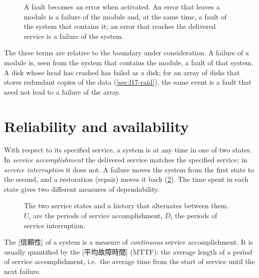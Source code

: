 \documentclass[../main.tex]{subfiles}
\begin{document}
\begin{figure}[htbp]
  \centering
  
  \caption{A fault becomes an error when activated.  An error that leaves a
    module is a failure of the module and, at the same time, a fault of the
    system that contains it; an error that reaches the delivered service is a
    failure of the system.}
  \label{fig:l17-fault-chain}
\end{figure}

The three terms are relative to the boundary under consideration.  A failure
of a module is, seen from the system that contains the module, a fault of
that system.  A disk whose head has crashed has failed as a disk; for an
array of disks that stores redundant copies of the data (\cref{sec:l17-raid}),
the same event is a fault that need not lead to a failure of the array.

\section{Reliability and availability}
\label{sec:l17-reliability}

With respect to its specified service, a system is at any time in one of
two states.  In \emph{service
accomplishment} the delivered service matches the specified service; in
\emph{service interruption} it does not.  A failure moves the system from
the first state to the second, and a restoration (repair) moves it back
(\cref{fig:l17-service-timeline}).  The time spent in each state gives two
different measures of dependability.

\begin{figure}[htbp]
  \centering
  
  \caption{The two service states and a history that alternates between
    them.  $U_i$ are the periods of service accomplishment, $D_i$ the periods
    of service interruption.}
  \label{fig:l17-service-timeline}
\end{figure}

\begin{definition}[Reliability]
  The [信頼性] of a system is a measure of
  \emph{continuous} service accomplishment.  It is usually quantified by the
  [平均故障時間]
  (MTTF): the average length of a period of service accomplishment, i.e.\
  the average time from the start of service until the next failure.
\end{definition}
\end{document}

